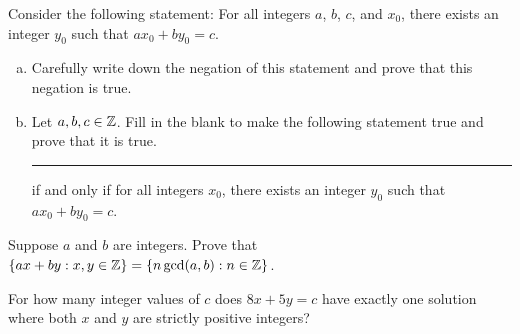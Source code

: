 \question Consider the following statement:
For all integers $a$, $b$, $c$, and $x_0$, there exists an integer $y_0$ such that $ax_0+by_0=c$.
\begin{enumerate}[(a)]
  \item Carefully write down the negation of this statement and prove that this negation is true.
  \item Let $a,b,c\in\mathbb{Z}$.
        Fill in the blank to make the following statement true and prove that it is true.
        \rule{3cm}{0.15mm} if and only if for all integers $x_0$,
        there exists an integer $y_0$ such that $ax_0+by_0=c$.
\end{enumerate}


\question Suppose $a$ and $b$ are integers.
Prove that $\{ax+by : x,y\in\mathbb{Z}\} = {\{n\gcd(a,b) : n\in\mathbb{Z}\}}$.



\question For how many integer values of $c$ does $8x+5y=c$ have exactly one solution
where both $x$ and $y$ are strictly positive integers?


